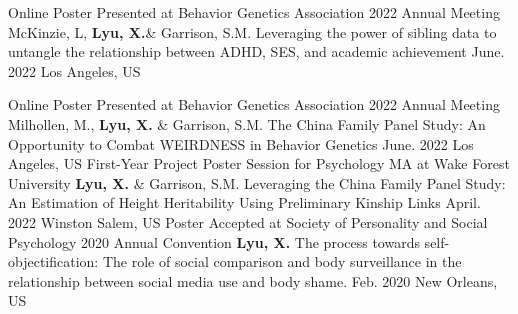 

\begin{cventries2}

  \cventryx
	{Online Poster Presented at Behavior Genetics Association 2022 Annual Meeting} %
    {McKinzie, L, \textbf{Lyu, X.}\& Garrison, S.M. Leveraging the power of sibling data to untangle the relationship between ADHD, SES, and academic achievement} 
    {June. 2022} %
    {Los Angeles, US} %
    
    \cventryx
  	{Online Poster Presented at Behavior Genetics Association 2022 Annual Meeting} %
    {Milhollen, M., \textbf{Lyu, X.}  \& Garrison, S.M. The China Family Panel Study: An Opportunity to Combat WEIRDNESS in Behavior Genetics} 
    {June. 2022} %
    {Los Angeles, US} %
    \cventryx
  	{First-Year Project Poster Session for Psychology MA at Wake Forest University} %
    {\textbf{Lyu, X.}  \& Garrison, S.M. Leveraging the China Family Panel Study: An Estimation of Height Heritability Using Preliminary Kinship Links} 
    {April. 2022} %
    {Winston Salem, US} %
    \cventryx
	{Poster Accepted at Society of Personality and Social Psychology 2020 Annual Convention} %
    {\textbf{Lyu, X.} The process towards self-objectification: The role of social comparison and body surveillance in the relationship between social media use and body shame. } %
    {Feb. 2020} %
    {New Orleans, US}

\end{cventries2}

